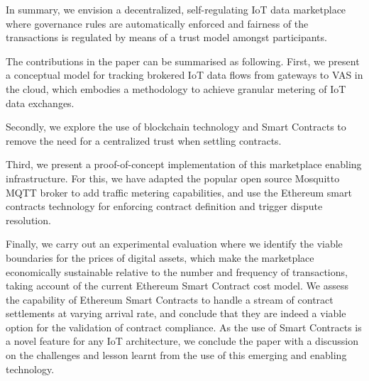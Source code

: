 \documentclass[chi_draft]{sigchi}
\begin{document}
In summary, we envision a decentralized, self-regulating IoT data marketplace where governance rules are automatically enforced and fairness of the transactions is regulated by means of a trust model amongst participants.

The contributions in the paper can be summarised as following.
%
First,  we present a conceptual model for tracking brokered IoT data flows from gateways to VAS in the cloud, which embodies a methodology to achieve granular metering of IoT data exchanges.

Secondly, we explore the use of blockchain technology and Smart Contracts to remove the need for a centralized trust when settling contracts. 

Third, we present a proof-of-concept implementation of this marketplace enabling infrastructure. For this, we have adapted the popular open source Mosquitto MQTT broker to add traffic metering capabilities, and use the Ethereum smart contracts technology for enforcing contract definition and trigger dispute resolution.

Finally, we carry out an experimental evaluation where we identify the viable boundaries for the prices of digital assets, which make the marketplace economically sustainable relative to the number and frequency of transactions, taking account of the current Ethereum Smart Contract cost model.
We assess the capability of Ethereum Smart Contracts to handle a stream of contract settlements at varying arrival rate, and conclude that they are indeed a viable option for the validation of contract compliance.
As the use of Smart Contracts is a novel feature for any IoT architecture, we conclude the paper with a discussion on the challenges and lesson learnt from the use of this emerging and enabling technology.

%
%
\end{document}
